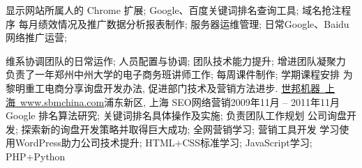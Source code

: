           {显示网站所属人的 Chrome 扩展; Google、百度关键词排名查询工具; 域名抢注程序 }
          {每月绩效情况及推广数据分析报表制作; 服务器运维管理; 日常Google、Baidu网络推广运营;}

          {维系协调团队的日常运作; 人员配置与协调; 团队技术能力提升; 增进团队凝聚力}
          {负责了一年郑州中州大学的电子商务班讲师工作; 每周课件制作; 学期课程安排}
          {为黎明重工电商分享询盘开发办法, 促进部门技术及营销方法进步.}
      \resumeItemListEnd
    \resumeSubheading
      {\href{http://www.shibangchina.com/}{世邦机器~上海~www.sbmchina.com}}{浦东新区, 上海}
      {SEO网络营销}{2009年11月 -- 2011年11月}
      \resumeItemListStart
          {Google 排名算法研究; 关键词排名具体操作及实施; 负责团队工作规划}
          {公司询盘开发; 探索新的询盘开发策略并取得巨大成功; 全网营销学习; 营销工具开发}
          {学习使用WordPress助力公司技术提升; HTML+CSS标准学习; JavaScript学习; PHP+Python}
      \resumeItemListEnd
  \resumeSubHeadingListEnd
